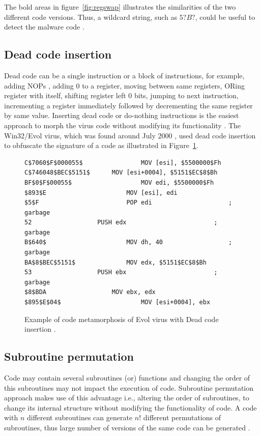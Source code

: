 The bold areas in figure~\ref{fig:regswap} illustrates the similarities of the two different code versions. Thus, a wildcard string, such as $5? B?$, could be useful to detect the malware code \cite{bib22}. 

\subsection{Dead code insertion} 

Dead code can be a single instruction or a block of instructions, for example, adding NOPs \cite{bib23}, adding 0 to a register, moving between same registers, ORing register with itself, shifting register left 0 bits, jumping to next instruction, incrementing a register immediately followed by decrementing the same register by same value. Inserting dead code or do-nothing instructions is the easiest approach to morph the virus code without modifying its functionality \cite{bib23}. 
The Win32/Evol virus, which was found around July 2000 \cite{bib24}, used dead code insertion to obfuscate the signature of a code as illustrated in Figure~\ref{fig:deadcode}. 

\begin{figure}
  \centering
  \begin{lstlisting}[language=myasm]
C$7060$F$000055$				MOV [esi], $5500000$Fh
C$746048$BEC$5151$		MOV [esi+0004], $5151$EC$8$Bh
BF$0$F$00055$					MOV edi, $5500000$Fh
$893$E 						MOV [esi], edi
$5$F 						POP edi						; garbage
52 					PUSH edx						; garbage
B$640$ 						MOV dh, 40 					; garbage
BA$8$BEC$5151$ 				MOV edx, $5151$EC$8$Bh
53 					PUSH ebx						; garbage
$8$BDA					MOV ebx, edx
$895$E$04$						MOV [esi+0004], ebx  
\end{lstlisting}
    \caption[Example of code metamorphosis of Evol virus ]{Example of code metamorphosis of Evol virus with Dead code insertion \cite{bib23}.}
    \label{fig:deadcode}
\end{figure}

\subsection{Subroutine permutation} 

Code may contain several subroutines (or) functions and changing the order of this subroutines may not impact the execution of code. Subroutine permutation approach makes use of this advantage i.e., altering the order of subroutines, to change its internal structure without modifying the functionality of code. A code with $n$ different subroutines can generate $n!$ different permutations of subroutines, thus large number of versions of the same code can be generated \cite{bib4}.


